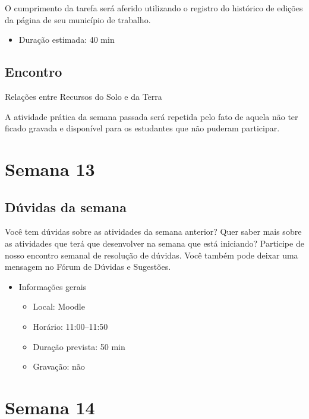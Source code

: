 \documentclass[
  11pt,
  a4paper,
  dvipsnames]{tufte-book}
\providecommand{\tightlist}{%
  \setlength{\itemsep}{0pt}\setlength{\parskip}{0pt}}
\begin{document}
O cumprimento da tarefa será aferido utilizando o registro do histórico de edições da página de seu município de trabalho.

\begin{itemize}
\tightlist
\item
  Duração estimada: 40 min
\end{itemize}

\hypertarget{encontro-5}{%
\section{Encontro}\label{encontro-5}}

Relações entre Recursos do Solo e da Terra

A atividade prática da semana passada será repetida pelo fato de aquela não ter ficado gravada e disponível para os estudantes que não puderam participar.

\hypertarget{semana-13}{%
\chapter{Semana 13}\label{semana-13}}

\hypertarget{duxfavidas-da-semana-11}{%
\section{Dúvidas da semana}\label{duxfavidas-da-semana-11}}

Você tem dúvidas sobre as atividades da semana anterior? Quer saber mais sobre as atividades que terá que desenvolver na semana que está iniciando? Participe de nosso encontro semanal de resolução de dúvidas. Você também pode deixar uma mensagem no Fórum de Dúvidas e Sugestões.

\begin{itemize}
\tightlist
\item
  Informações gerais

  \begin{itemize}
  \tightlist
  \item
    Local: Moodle
  \item
    Horário: 11:00--11:50
  \item
    Duração prevista: 50 min
  \item
    Gravação: não
  \end{itemize}
\end{itemize}

\hypertarget{semana-14}{%
\chapter{Semana 14}\label{semana-14}}
\end{document}
